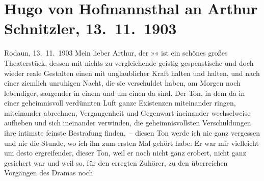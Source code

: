 

         
         \renewcommand{\erwaehntePersonen}{Personen: Hugo von Hofmannsthal}
         \renewcommand{\erwaehnteOrte}{Orte: Rodaun, Wien}
         \renewcommand{\erwaehnteWerke}{Werke: Anatol, Der einsame Weg. Schauspiel in fünf Akten}
               \section[Hugo von Hofmannsthal an Arthur Schnitzler, 13. 11. 1903]{ Hugo von Hofmannsthal an Arthur Schnitzler, 13. 11. 1903}\nopagebreak{}\rehead{ }\begin{ledgroupsized}[t]{13cm}\normalsize\beginnumbering{} \toendnotes[C]{\smallbreak\pagebreak[2]} \toendnotes[C]{\smallbreak}\pstart
           \raggedleft{}{\pb}Rodaun, 13. 11. 1903\pend
           \pstart{}Mein lieber Arthur, \pend\pstart
           der »« ist ein schönes großes Theaterstück, dessen mit nichts zu vergleichende
               geistig-gespenstische und doch wieder reale Gestalten einen mit unglaublicher Kraft
               halten und halten, und nach einer ziemlich unruhigen Nacht, die sie verschuldet
               haben, am Morgen noch lebendiger, saugender in einem und um einen da sind. Der Ton,
               in dem da in einer geheimnisvoll verdünnten Luft ganze Existenzen miteinander ringen,
               miteinander abrechnen, Vergangenheit und Gegenwart ineinander wechselweise aufheben
               und sich ineinander verwinden, die geheimnisvollsten Verschuldungen ihre intimste
               feinste Bestrafung finden, – diesen Ton werde ich nie ganz vergessen und nie die
               Stunde, wo ich ihn zum ersten Mal gehört habe. Er war mir vielleicht um desto
               ergreifender, dieser Ton, weil er noch nicht ganz erobert, nicht ganz gesichert war
               und weil so, für den erregten Zuhörer, zu den überreichen Vorgängen des Dramas noch

\end{ledgroupsized}

